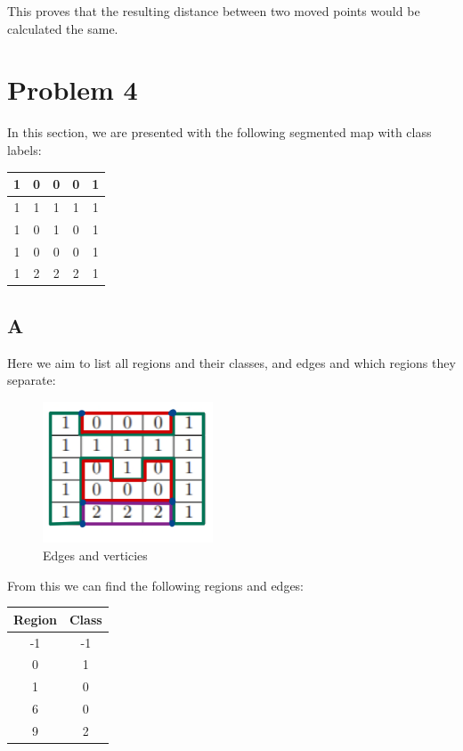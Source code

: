 \documentclass{article}
\begin{document}
\noindent This proves that the resulting distance between two moved points would be calculated the same.


\section*{Problem 4}

In this section, we are presented with the following segmented map with class labels:

\begin{center}
    \begin{tabular}{ | c | c | c | c | c | }
        \hline
        1 & 0 & 0 & 0 & 1 \\ 
        \hline
        1 & 1 & 1 & 1 & 1 \\ 
        \hline
        1 & 0 & 1 & 0 & 1 \\ 
        \hline
        1 & 0 & 0 & 0 & 1 \\ 
        \hline
        1 & 2 & 2 & 2 & 1 \\ 
        \hline  
    \end{tabular}
\end{center}

\subsection*{A}

Here we aim to list all regions and their classes, and edges and which regions they separate:

\begin{figure}[H]
    \centering
    \includegraphics[width = 0.45\textwidth]{imgs/edges_verticies.png}
    \caption{Edges and verticies}
    \label{fig:edges_verticies}
\end{figure}

From this we can find the following regions and edges:

\begin{center}
    \begin{tabular}{ | c | c | }
        Region & Class \\
        \hline
        -1 & -1 \\
        0 & 1 \\
        1 & 0 \\
        6 & 0\\
        9 & 2 \\
    \end{tabular}
\end{center}
\end{document}
